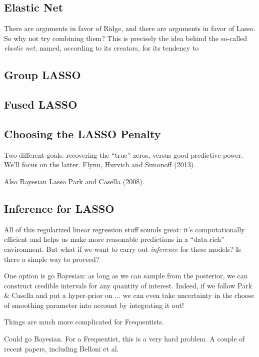 \documentclass[12pt]{article}
\theoremstyle{definition}
\begin{document}
\subsection{Elastic Net}
There are arguments in favor of Ridge, and there are arguments in favor of Lasso. So why not try combining them? This is precisely the idea behind the so-called \emph{elastic net}, named, according to its creators, for its tendency to

\subsection{Group LASSO}

\subsection{Fused LASSO}

\subsection{Choosing the LASSO Penalty}
Two different goals: recovering the ``true'' zeros, versus good predictive power. We'll focus on the latter.
Flynn, Hurvich and Simonoff (2013).

Also Bayesian Lasso Park and Casella (2008).



\subsection{Inference for LASSO}
All of this regularized linear regression stuff sounds great: it's computationally efficient and helps us make more reasonable predictions in a ``data-rich'' environment. But what if we want to carry out \emph{inference} for these models? Is there a simple way to proceed? 

One option is go Bayesian: as long as we can sample from the posterior, we can construct credible intervals for any quantity of interest. Indeed, if we follow Park \& Casella and put a hyper-prior on ... we can even take uncertainty in the choose of smoothing parameter into account by integrating it out! 

Things are much more complicated for Frequentists. 


Could go Bayesian. For a Frequentist, this is a very hard problem. A couple of recent papers, including Belloni et al.
\end{document}
